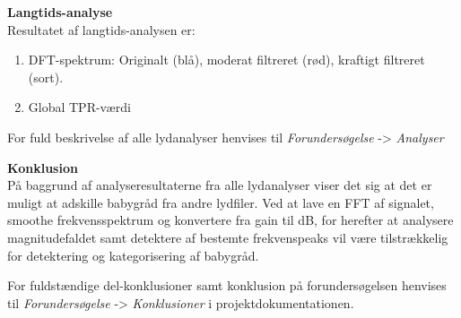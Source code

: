 \textbf{Langtids-analyse} \\
Resultatet af langtids-analysen er:
\begin{enumerate}
\item DFT-spektrum: Originalt (blå), moderat filtreret (rød), kraftigt filtreret (sort).
\item Global TPR-værdi
\end{enumerate}


For fuld beskrivelse af alle lydanalyser henvises til \textit{Forundersøgelse} -> \textit{Analyser}

\textbf{Konklusion}\\ 
På baggrund af analyseresultaterne fra alle lydanalyser viser det sig at det er muligt at adskille babygråd fra andre lydfiler. Ved at lave en FFT af signalet, smoothe frekvensspektrum og konvertere fra gain til dB, for herefter at analysere magnitudefaldet samt detektere af bestemte frekvenspeaks vil være tilstrækkelig for detektering og kategorisering af babygråd. 

For fuldstændige del-konklusioner samt konklusion på forundersøgelsen henvises til \textit{Forundersøgelse} -> \textit{Konklusioner} i projektdokumentationen. 